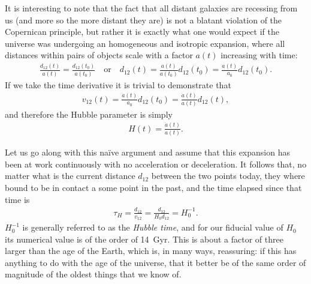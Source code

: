 It is interesting to note that the fact that all distant galaxies are recessing
from us (and more so the more distant they are) is not a blatant violation of the
Copernican principle, but rather it is exactly what one would
expect if the universe was undergoing an homogeneous and isotropic expansion, where
all distances within pairs of objects scale with a factor $a(t)$ increasing with time:
\begin{align*}
  \frac{d_{12}(t)}{a(t)} = \frac{d_{12}(t_0)}{a(t_0)} \quad\text{or}\quad
	d_{12}(t) = \frac{a(t)}{a(t_0)} d_{12}(t_0) = \frac{a(t)}{a_0} d_{12}(t_0).
\end{align*}
If we take the time derivative it is trivial to demonstrate that
\begin{align*}
	v_{12}(t) = \frac{\dot{a}(t)}{a_0} d_{12}(t_0) = \frac{\dot{a}(t)}{a(t)} d_{12}(t),
\end{align*}
and therefore the Hubble parameter is simply
\begin{align}
	H(t) = \frac{ \dot{a}(t)}{a(t)}.
\end{align}

Let us go along with this na\"ive argument and assume that this expansion has been
at work continuously with no acceleration or deceleration. It follows that, no matter
what is the current distance $d_{12}$ between the two points today, they where bound
to be in contact a some point in the past, and the time elapsed since that time is
\begin{align*}
	\tau_H = \frac{d_{12}}{v_{12}} = \frac{d_{12}}{H_0 d_{12}} = H_0^{-1}.
\end{align*}
$H_0^{-1}$ is generally referred to as the \emph{Hubble time}, and for our fiducial
value of $H_0$ its numerical value is of the order of 14~Gyr. This is about a factor
of three larger than the age of the Earth, which is, in many ways, reassuring: if
this has anything to do with the age of the universe, that it better be of the same
order of magnitude of the oldest things that we know of.

